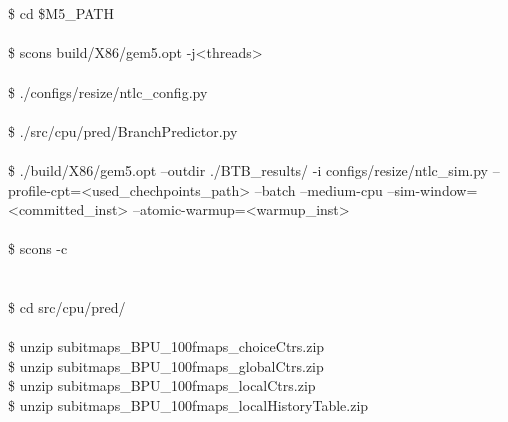 \begin{center}
    \begin{tcolorbox}[width=\linewidth]
        \ttfamily
         \\
        
         \\
        \$ cd \$M5\_PATH \\
         
        \\
        \$ scons build/X86/gem5.opt -j<threads> \\
        
         \\
        \$ ./configs/resize/ntlc\_config.py \\
         \\
        \$ ./src/cpu/pred/BranchPredictor.py \\
        
         \\
        \$ ./build/X86/gem5.opt --outdir ./BTB\_results/ -i configs/resize/ntlc\_sim.py --profile-cpt=<used\_chechpoints\_path> --batch --medium-cpu --sim-window=<committed\_inst> --atomic-warmup=<warmup\_inst> \\
        
         \\
        \$ scons -c \\
        
         \\
        
         \\
        \$ cd src/cpu/pred/ \\
        
         \\
        \$ unzip subitmaps\_BPU\_100fmaps\_choiceCtrs.zip \\
        \$ unzip subitmaps\_BPU\_100fmaps\_globalCtrs.zip \\
        \$ unzip subitmaps\_BPU\_100fmaps\_localCtrs.zip \\
        \$ unzip subitmaps\_BPU\_100fmaps\_localHistoryTable.zip \\
        

\end{tcolorbox}
\end{center}
